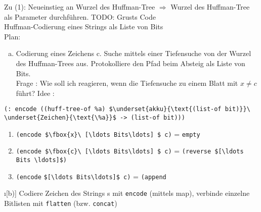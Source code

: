 Zu (1): Neueinstieg an Wurzel des Huffman-Tree $\Rightarrow$ Wurzel des Huffman-Tree als Parameter durchführen.
TODO: Grusts Code\\
Huffman-Codierung eines Strings als Liste von Bits\\
Plan:
\begin{enumerate}[a)]
\item
Codierung eines Zeichens c. Suche mittels einer Tiefensuche von der Wurzel des Huffman-Trees aus. Protokolliere den Pfad beim Absteig als Liste von Bits.\\
Frage : Wie soll ich reagieren, wenn die Tiefensuche zu einem Blatt mit $x \ne c$ führt?
Idee : \end{enumerate}
\lstinline[mathescape]|(: encode ((huff-tree-of %a) $\underset{akku}{\text{(list-of bit)}}\ \underset{Zeichen}{\text{\%a}}$ -> (list-of bit)))|
\begin{enumerate}[(1)]
\item \lstinline[mathescape]|(encode $\fbox{x}\ [\ldots Bits\ldots] $ c)| = \lstinline|empty|
\item \lstinline[mathescape]|(encode $\fbox{c}\ [\ldots Bits\ldots] $ c)| = \lstinline[mathescape]|(reverse $[\ldots Bits \ldots]$)|
\item \lstinline[mathescape]|(encode|  \lstinline[mathescape]|$[\ldots Bits\ldots]$ c)| = \lstinline[mathescape]|(append|
\end{enumerate}
\begin{enumerate}
\i[b)] Codiere Zeichen des Strings s mit \lstinline|encode| (mittels map), verbinde einzelne Bitlisten mit \lstinline|flatten| (bzw. \lstinline|concat|)
\end{enumerate}